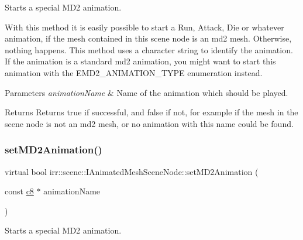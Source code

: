 Starts a special M\+D2 animation. 

With this method it is easily possible to start a Run, Attack, Die or whatever animation, if the mesh contained in this scene node is an md2 mesh. Otherwise, nothing happens. This method uses a character string to identify the animation. If the animation is a standard md2 animation, you might want to start this animation with the E\+M\+D2\+\_\+\+A\+N\+I\+M\+A\+T\+I\+O\+N\+\_\+\+T\+Y\+PE enumeration instead. 
\begin{DoxyParams}{Parameters}
{\em animation\+Name} & Name of the animation which should be played. \\
\hline
\end{DoxyParams}
\begin{DoxyReturn}{Returns}
Returns true if successful, and false if not, for example if the mesh in the scene node is not an md2 mesh, or no animation with this name could be found. 
\end{DoxyReturn}
\mbox{\label{classirr_1_1scene_1_1IAnimatedMeshSceneNode_a8732866332327a7d43b91f41b5549fe3}} 
\subsubsection{\texorpdfstring{set\+M\+D2\+Animation()}{setMD2Animation()}\hspace{0.1cm}{\footnotesize\ttfamily [4/4]}}
{\footnotesize\ttfamily virtual bool irr\+::scene\+::\+I\+Animated\+Mesh\+Scene\+Node\+::set\+M\+D2\+Animation (\begin{DoxyParamCaption}\item[{const \hyperlink{namespaceirr_a9395eaea339bcb546b319e9c96bf7410}{c8} $\ast$}]{animation\+Name }\end{DoxyParamCaption})\hspace{0.3cm}{\ttfamily [pure virtual]}}



Starts a special M\+D2 animation. 

